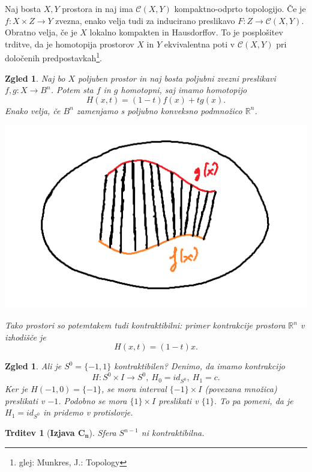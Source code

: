 \documentclass[10pt, a4paper]{article}
\newtheorem{trditev}[izr]{Trditev}
\newtheorem{zgled}[izr]{Zgled}
\newcommand{\R}{\mathbb {R}}
\begin{document}
  Naj bosta $X, Y$ prostora in naj ima $\mathcal{C} (X, Y)$ kompaktno-odprto topologijo.
  Če je $f: X \times Z \to Y$ zvezna, enako velja tudi za inducirano preslikavo $F: Z \to \mathcal{C} (X, Y)$.
  Obratno velja, če je $X$ lokalno kompakten in Hausdorffov. To je posplošitev trditve,
  da je homotopija prostorov $X$ in $Y$ ekvivalentna poti v $\mathcal{C}(X, Y)$ pri določenih predpostavkah\footnote[2]{glej: Munkres, J.: Topology}.

\begin{zgled}
  Naj bo $X$ poljuben prostor in naj bosta poljubni zvezni preslikavi $f, g : X \to B^n$.
  Potem sta $f$ in $g$ homotopni, saj imamo homotopijo $$H(x, t) = (1 - t) f(x) + t g(x).$$
  Enako velja, če $B^n$ zamenjamo s poljubno konveksno podmnožico $\R^n$.
  \begin{center}
    \includegraphics[scale=0.7]{zgled7.png}
  \end{center}  
  Tako prostori so potemtakem tudi kontraktibilni: primer kontrakcije prostora $\R^n$ v izhodišče je 
  $$H(x, t) = (1 - t)x.$$
\end{zgled}

\begin{zgled}
  Ali je $S^0 = \{-1, 1\}$ kontraktibilen? Denimo, da imamo kontrakcijo 
  $$H: S^0 \times I \to S^0,\ H_0 = id_{S^0},\ H_1 = c.$$
  Ker je $H(-1, 0) = \{-1\}$, se mora interval $\{-1\} \times I$ (povezana množica)
  preslikati v $-1$. Podobno se mora $\{1\} \times I$ preslikati v $\{1\}$.
  To pa pomeni, da je $H_1 = id_{S^0}$ in pridemo v protislovje.
\end{zgled}

\begin{trditev}[\textbf{Izjava $\mathbf{C_n}$}]
  Sfera $S^{n - 1}$ ni kontraktibilna.
\end{trditev}
\end{document}
